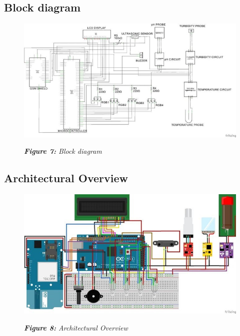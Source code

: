\documentclass[12pt]{article}
\begin{document}
\subsection*{Block diagram}

\begin{figure}
\includegraphics[scale=0.4]{block.jpg}   %
\begin{center}
\textit{\textbf{Figure 7:} Block diagram } %
\end{center}
\end{figure}
\newpage
\subsection*{Architectural Overview}

\begin{figure}
\includegraphics[scale=0.4]{arch.jpg}   %
\begin{center}
\textit{\textbf{Figure 8:} Architectural Overview}  %
\end{center}
\end{figure}
\newpage
\end{document}
